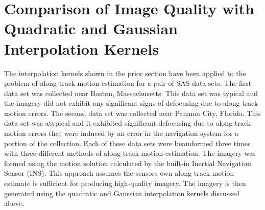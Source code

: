 \documentclass[conference]{IEEEtran}
\begin{document}
\section{Comparison of Image Quality with Quadratic and Gaussian Interpolation Kernels}
The interpolation kernels shown in the prior section have been applied to the problem of along-track motion estimation for a pair of SAS data sets. The first data set was collected near Boston, Massachusetts. This data set was typical and the imagery did not exhibit any significant signs of defocusing due to along-track motion errors. The second data set was collected near Panama City, Florida. This data set was atypical and it exhibited significant defocusing due to along-track motion errors that were induced by an error in the navigation system for a portion of the collection. Each of these data sets were beamformed three times with three different methods of along-track motion estimation. The imagery was formed using the motion solution calculated by the built-in Inertial Navigation Sensor (INS). This approach assumes the sensors own along-track motion estimate is sufficient for producing high-quality imagery. The imagery is then generated using the quadratic and Gaussian interpolation kernels discussed above.
\end{document}
